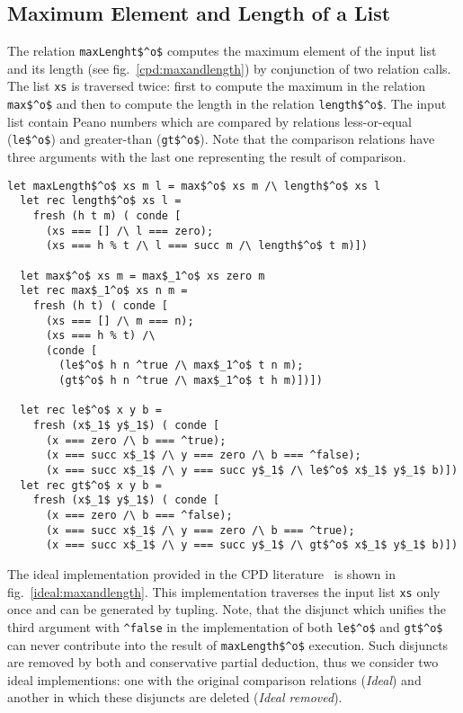 \subsection{Maximum Element and Length of a List}

The relation \lstinline{maxLenght$^o$} computes the maximum element of the input list and its length (see fig.~\ref{cpd:maxandlength}) by conjunction of two relation calls.
The list \lstinline{xs} is traversed twice: first to compute the maximum in the relation \lstinline{max$^o$} and then to compute the length in the relation \lstinline{length$^o$}.
The input list contain Peano numbers which are compared by relations less-or-equal (\lstinline{le$^o$}) and greater-than (\lstinline{gt$^o$}).
Note that the comparison relations have three arguments with the last one representing the result of comparison.

\begin{figure*}[!h]
  \centering
  \begin{minipage}{0.85\textwidth}
\begin{lstlisting}[label={cpd:maxandlength}, caption={Maximum element and length of the list}, captionpos=b, frame=tb]
  let maxLength$^o$ xs m l = max$^o$ xs m /\ length$^o$ xs l
  let rec length$^o$ xs l =
    fresh (h t m) ( conde [
      (xs === [] /\ l === zero);
      (xs === h % t /\ l === succ m /\ length$^o$ t m)])

  let max$^o$ xs m = max$_1^o$ xs zero m
  let rec max$_1^o$ xs n m =
    fresh (h t) ( conde [
      (xs === [] /\ m === n);
      (xs === h % t) /\
      (conde [
        (le$^o$ h n ^true /\ max$_1^o$ t n m);
        (gt$^o$ h n ^true /\ max$_1^o$ t h m)])])

  let rec le$^o$ x y b =
    fresh (x$_1$ y$_1$) ( conde [
      (x === zero /\ b === ^true);
      (x === succ x$_1$ /\ y === zero /\ b === ^false);
      (x === succ x$_1$ /\ y === succ y$_1$ /\ le$^o$ x$_1$ y$_1$ b)])
  let rec gt$^o$ x y b =
    fresh (x$_1$ y$_1$) ( conde [
      (x === zero /\ b === ^false);
      (x === succ x$_1$ /\ y === zero /\ b === ^true);
      (x === succ x$_1$ /\ y === succ y$_1$ /\ gt$^o$ x$_1$ y$_1$ b)])
  \end{lstlisting}
\end{minipage}
\end{figure*}

The ideal implementation provided in the CPD literature~\cite{de1999conjunctive} is shown in fig.~\ref{ideal:maxandlength}.
This implementation traverses the input list \lstinline{xs} only once and can be generated by tupling.
Note, that the disjunct which unifies the third argument with \lstinline{^false} in the implementation of both \lstinline{le$^o$} and \lstinline{gt$^o$} can never contribute into the result of \lstinline{maxLength$^o$} execution.
Such disjuncts are removed by both \ecce and conservative partial deduction, thus we consider two ideal implementions: one with the original comparison relations (\emph{Ideal}) and another in which these disjuncts are deleted (\emph{Ideal removed}).

